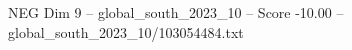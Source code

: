 \begin{textsample}{NEG Dim 9 – global\_south\_2023\_10 – Score -10.00 – global\_south\_2023\_10/103054484.txt}
\end{textsample}
